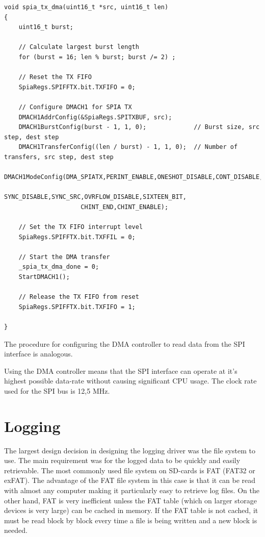 \begin{verbatim}
void spia_tx_dma(uint16_t *src, uint16_t len)
{
    uint16_t burst;

    // Calculate largest burst length
    for (burst = 16; len % burst; burst /= 2) ;

    // Reset the TX FIFO
    SpiaRegs.SPIFFTX.bit.TXFIFO = 0;

    // Configure DMACH1 for SPIA TX
    DMACH1AddrConfig(&SpiaRegs.SPITXBUF, src);
    DMACH1BurstConfig(burst - 1, 1, 0);             // Burst size, src step, dest step
    DMACH1TransferConfig((len / burst) - 1, 1, 0);  // Number of transfers, src step, dest step
    DMACH1ModeConfig(DMA_SPIATX,PERINT_ENABLE,ONESHOT_DISABLE,CONT_DISABLE,
                     SYNC_DISABLE,SYNC_SRC,OVRFLOW_DISABLE,SIXTEEN_BIT,
                     CHINT_END,CHINT_ENABLE);

    // Set the TX FIFO interrupt level
    SpiaRegs.SPIFFTX.bit.TXFFIL = 0;

    // Start the DMA transfer
    _spia_tx_dma_done = 0;
    StartDMACH1();

    // Release the TX FIFO from reset
    SpiaRegs.SPIFFTX.bit.TXFIFO = 1;

}
\end{verbatim}

The procedure for configuring the DMA controller to read data from the SPI interface is analogous.

Using the DMA controller means that the SPI interface can operate at it's highest possible data-rate without causing significant CPU usage. The clock rate used for the SPI bus is 12,5 MHz.

\section{Logging} \label{logging}

The largest design decision in designing the logging driver was the file system to use. The main requirement was for the logged data to be quickly and easily retrievable. The most commonly used file system on SD-cards is FAT (FAT32 or exFAT). The advantage of the FAT file system in this case is that it can be read with almost any computer making it particularly easy to retrieve log files. On the other hand, FAT is very inefficient unless the FAT table (which on larger storage devices is very large) can be cached in memory. If the FAT table is not cached, it must be read block by block every time a file is being written and a new block is needed.

